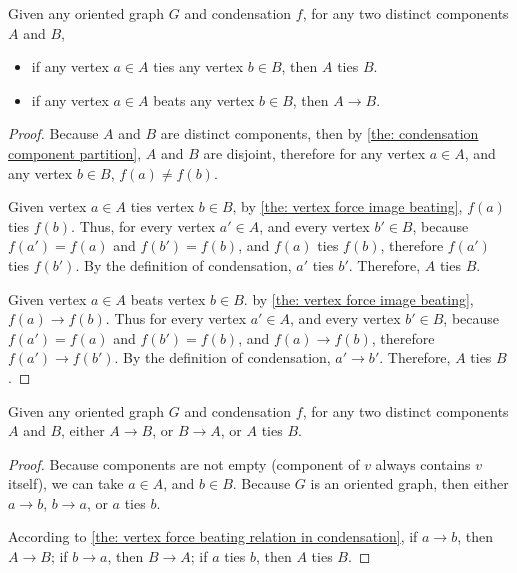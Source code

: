 \begin{theorem}\label{the: vertex force beating relation in condensation}
  Given any oriented graph \(G\) and condensation \(f\),
  for any two distinct components \(A\) and \(B\),
  \begin{itemize}
    \item
      if any vertex \(a \in A\) ties any vertex \(b \in B\),
      then \(A\) ties \(B\).
    \item
      if any vertex \(a \in A\) beats any vertex \(b \in B\),
      then \(A \to B\).
  \end{itemize}
\end{theorem}

\begin{proof}
  Because \(A\) and \(B\) are distinct components,
  then by \cref{the: condensation component partition},
  \(A\) and \(B\) are disjoint,
  therefore for any vertex \(a \in A\),
  and any vertex \(b \in B\), \(f(a) \neq f(b)\).

  Given vertex \(a \in A\) ties vertex \(b \in B\),
  by \cref{the: vertex force image beating},
  \(f(a)\) ties \(f(b)\).
  Thus, for every vertex \(a' \in A\),
  and every vertex \(b' \in B\),
  because \(f(a') = f(a)\) and \(f(b') = f(b)\),
  and \(f(a)\) ties \(f(b)\), therefore \(f(a')\) ties \(f(b')\).
  By the definition of condensation, \(a'\) ties \(b'\).
  Therefore, \(A\) ties \(B\).

  Given vertex \(a \in A\) beats vertex \(b \in B\).
  by \cref{the: vertex force image beating},
  \(f(a) \to f(b)\).
  Thus for every vertex \(a' \in A\),
  and every vertex \(b' \in B\),
  because \(f(a') = f(a)\) and \(f(b') = f(b)\),
  and \(f(a) \to f(b)\), therefore \(f(a') \to f(b')\).
  By the definition of condensation, \(a' \to b'\).
  Therefore, \(A\) ties \(B\).
\end{proof}

\begin{corollary}\label{the: components are vertex in condensation}
  Given any oriented graph \(G\) and condensation \(f\),
  for any two distinct components \(A\) and \(B\),
  either \(A \to B\), or \(B \to A\), or \(A\) ties \(B\).
\end{corollary}

\begin{proof}
  Because components are not empty
  (component of \(v\) always contains \(v\) itself),
  we can take \(a \in A\), and \(b \in B\).
  Because \(G\) is an oriented graph,
  then either \(a \to b\), \(b \to a\), or \(a\) ties \(b\).

  According to \cref{the: vertex force beating relation in condensation},
  if \(a \to b\), then \(A \to B\);
  if \(b \to a\), then \(B \to A\);
  if \(a\) ties \(b\), then \(A\) ties \(B\).
\end{proof}

